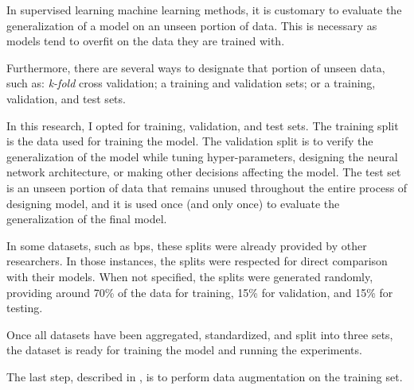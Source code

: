 
In supervised learning machine learning methods, it is
customary to evaluate the generalization of a model on an
unseen portion of data. This is necessary as models tend to
\gls{overfit} on the data they are trained with.

Furthermore, there are several ways to designate that
portion of unseen data, such as: \emph{k-fold} cross
validation; a training and validation sets; or a training,
validation, and test sets. 

In this research, I opted for training, validation, and test
sets. The training split is the data used for training the
model. The validation split is to verify the generalization
of the model while tuning hyper-parameters, designing the
neural network architecture, or making other decisions
affecting the model. The test set is an unseen portion of
data that remains unused throughout the entire process of
designing model, and it is used once (and only once) to
evaluate the generalization of the final model.

In some datasets, such as \gls{bps}, these splits were
already provided by other researchers. In those instances,
the splits were respected for direct comparison with their
models. When not specified, the splits were generated
randomly, providing around 70\% of the data for training,
15\% for validation, and 15\% for testing.

Once all datasets have been aggregated, standardized, and
split into three sets, the dataset is ready for training the
model and running the experiments.

The last step, described in , is to
perform data augmentation on the training set.
